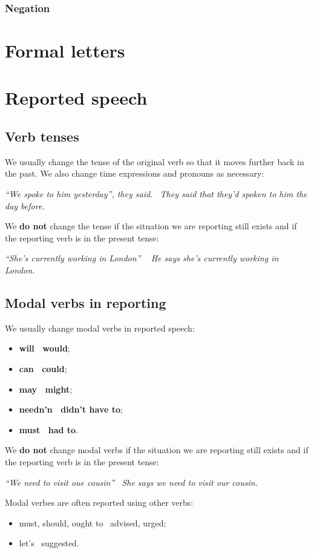 \documentclass{article}
\newcommand{\tox}{\textrightarrow\ }
\begin{document}
\subsubsection{Negation}


\section{Formal letters}

\newpage
\section{Reported speech}
\subsection{Verb tenses}
We usually change the tense of the original verb so that it moves
further back in the past. We also change time expressions and pronouns
as necessary:

\textit{``We spoke to him yesterday'', they said.\tox
They said that they'd spoken to him the day before.}

We \textbf{do not} change the tense if the situation we are reporting still
exists and if the reporting verb is in the present tense:

\textit{``She's currently working in London'' \tox
He says she's currently working in London.}

\subsection{Modal verbs in reporting}
We usually change modal verbs in reported speech:
\begin{itemize}
    \item \textbf{will \tox would};
    \item \textbf{can \tox could};
    \item \textbf{may \tox might};
    \item \textbf{needn'n \tox didn't have to};
    \item \textbf{must \tox had to}.
\end{itemize}

We \textbf{do not} change modal verbs if the situation we are
reporting still exists and if the reporting verb is in the present
tense:

\textit{``We need to visit oue cousin'' \tox She says we need to
visit our cousin.}

Modal verbes are often reported using other verbs:
\begin{itemize}
    \item must, should, ought to \tox advised, urged;
    \item let's \tox suggested.
\end{itemize}
\end{document}
